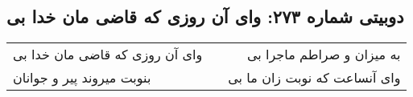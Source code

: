 \begin{center}
\section*{دوبیتی شماره ۲۷۳: وای آن روزی که قاضی مان خدا بی}
\label{sec:273}
\begin{longtable}{l p{0.5cm} r}
وای آن روزی که قاضی مان خدا بی
&&
به میزان و صراطم ماجرا بی
\\
بنوبت میروند پیر و جوانان
&&
وای آنساعت که نوبت زان ما بی
\\
\end{longtable}
\end{center}
